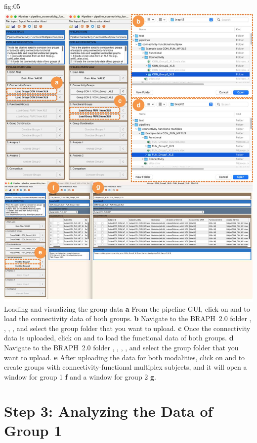 \documentclass[justified]{tufte-handout}
\begin{document}
	{fig:05}
	{
	\includegraphics{fig05.jpg}
	}
	{Loading and visualizing the group data}
	{
	{\bf a} From the pipeline GUI, click on  and  to load the connectivity data of both groups.
   	{\bf b} Navigate to the BRAPH~2.0 folder , , , , and select the group folder that you want to upload. 
        {\bf c} Once the connectivity data is uploaded, click on  and  to load the functional data of both groups.
   	{\bf d} Navigate to the BRAPH~2.0 folder , , , , and select the group folder that you want to upload. 
   	{\bf e} After uploading the data for both modalities, click on  and  to create groups with connectivity-functional multiplex subjects, and it will open a window for group 1 {\bf f}  and a window for group 2 {\bf g}.
	}
 
\clearpage
\section{Step 3: Analyzing the Data of Group 1}
\end{document}

